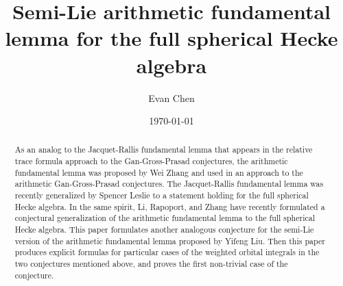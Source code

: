 \documentclass[12pt,colorlinks]{amsart}
\title[Semi-Lie Hecke AFL]
{Semi-Lie arithmetic fundamental lemma for the full spherical Hecke algebra}
\author{Evan Chen}
\date{\today}
\begin{document}
\maketitle

\begin{abstract}
  As an analog to the Jacquet-Rallis fundamental lemma that appears in the
  relative trace formula approach to the Gan-Gross-Prasad conjectures,
  the arithmetic fundamental lemma was proposed by Wei Zhang and used in an approach
  to the arithmetic Gan-Gross-Prasad conjectures.
  The Jacquet-Rallis fundamental lemma was recently generalized by Spencer Leslie
  to a statement holding for the full spherical Hecke algebra.
  In the same spirit, Li, Rapoport, and Zhang
  have recently formulated a conjectural generalization of the arithmetic
  fundamental lemma to the full spherical Hecke algebra.
  This paper formulates another analogous conjecture for the semi-Lie version
  of the arithmetic fundamental lemma proposed by Yifeng Liu.
  Then this paper produces explicit formulas for particular cases
  of the weighted orbital integrals in the two conjectures mentioned above,
  and proves the first non-trivial case of the conjecture.
\end{abstract}

\tableofcontents
\newpage




















\printbibliography[title=References]
\end{document}
